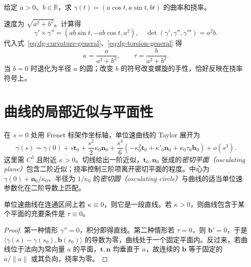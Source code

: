 \documentclass[UTF8,12pt,a4paper,fontset=fandol]{ctexbook}
\newcommand{\R}{\mathbb R}
\newcommand{\ip}[2]{\langle #1,#2\rangle}
\newcommand{\norm}[1]{\lVert #1\rVert}
\begin{document}
\begin{example}[圆柱螺线]\label{exam:dg-helix}
给定 $a>0$、$b\in\R$，求 $\gamma(t)=(a\cos t,a\sin t,bt)$ 的曲率和挠率。
\end{example}
\begin{solve}
速度为 $\sqrt{a^2+b^2}$。计算得
\[
 \gamma'\times\gamma''=(ab\sin t,-ab\cos t,a^2),\quad
 \det(\gamma',\gamma'',\gamma''')=a^2b.
\]
代入式~\eqref{eq:dg-curvature-general}、\eqref{eq:dg-torsion-general} 得
\[
 \kappa=\frac a{a^2+b^2},\qquad \tau=\frac b{a^2+b^2}.
\]
当 $b=0$ 时退化为半径 $a$ 的圆；改变 $b$ 的符号改变螺旋的手性，恰好反映在挠率符号上。
\end{solve}

\section{曲线的局部近似与平面性}
在 $s=0$ 处用 Frenet 标架作坐标轴，单位速曲线的 Taylor 展开为
\begin{equation}
 \gamma(s)=\gamma(0)+s\mathbf t_0+\frac{s^2}{2}\kappa_0\mathbf n_0
 +\frac{s^3}{6}(-\kappa_0^2\mathbf t_0+\kappa'_0\mathbf n_0
 +\kappa_0\tau_0\mathbf b_0)+o(s^3).
 \label{eq:dg-curve-taylor}
\end{equation}
这里需 $C^3$ 且附近 $\kappa>0$。切线给出一阶近似，$\mathbf t_0,\mathbf n_0$ 张成的\emph{密切平面（osculating plane）}包含二阶近似；挠率控制三阶项离开密切平面的程度。中心为 $\gamma(0)+\mathbf n_0/\kappa_0$、半径为 $1/\kappa_0$ 的\emph{密切圆（osculating circle）}与曲线的适当单位速参数化在二阶导数上匹配。

\begin{proposition}[零曲率与零挠率]
单位速曲线在连通区间上若 $\kappa\equiv0$，则它是一段直线。若 $\kappa>0$，则曲线包含于某个平面的充要条件是 $\tau\equiv0$。
\end{proposition}
\begin{proof}
第一种情形 $\gamma''=0$，积分即得直线。第二种情形若 $\tau=0$，则 $\mathbf b'=0$，于是 $\ip{\gamma(s)-\gamma(s_0)}{\mathbf b(s_0)}$ 的导数为零，曲线处于一个固定平面内。反过来，若曲线位于法向为常向量 $a$ 的平面，$\mathbf t,\mathbf n$ 均垂直于 $a$，故连续的 $\mathbf b$ 等于固定的 $a/\norm a$ 或其负向，挠率为零。
\end{proof}
\end{document}
